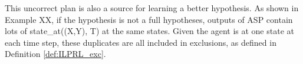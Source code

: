 This uncorrect plan is also a source for learning a better hypothesis. 
As shown in Example XX, if the hypothesis is not a full hypotheses, outputs of ASP contain lots of \textsf{state\_at((X,Y), T)} at the same states. 
Given the agent is at one state at each time step, these duplicates are all included in exclusions, as defined in Definition \ref{def:ILPRL_exc}.




